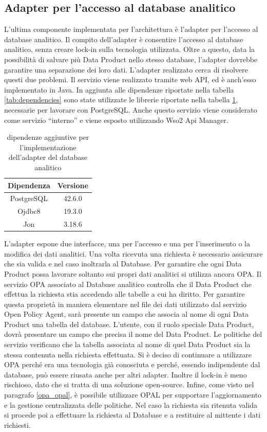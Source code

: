 \documentclass[12pt]{report}
\begin{document}
\subsection{Adapter per l'accesso al database analitico}
L'ultima componente implementata per l'architettura è l'adapter per l'accesso al database analitico.
Il compito dell'adapter è consentire l'accesso al database analitico, senza creare lock-in sulla tecnologia utilizzata.
Oltre a questo, data la possibilità di salvare più Data Product nello stesso database, l'adapter dovrebbe garantire una separazione dei loro dati.
L'adapter realizzato cerca di risolvere questi due problemi.
Il servizio viene realizzato tramite web API, ed è anch'esso implementato in Java.
In aggiunta alle dipendenze riportate nella tabella \ref{tab:dependencies} sono state utilizzate le librerie riportate nella tabella \ref{tab:dependencies2}, necessarie per lavorare con PostgreSQL.
Anche questo servizio viene considerato come servizio ``interno'' e viene esposto utilizzando Wso2 Api Manager.
\begin{table}
    \centering
    \begin{tabular}{|c|c|}
        \hline
        Dipendenza & Versione \\
        \hline
        PostgreSQL & 42.6.0 \\
        Ojdbc8 & 19.3.0 \\
        Jon & 3.18.6 \\
        \hline
    \end{tabular}
        \caption{dipendenze aggiuntive per l'implementazione dell'adapter del database analitico}
        \label{tab:dependencies2}
\end{table}
L'adapter espone due interfacce, una per l'accesso e una per l'inserimento o la modifica dei dati analitici.
Una volta ricevuta una richiesta è necessario assicurare che sia valida e nel caso inoltrarla al Database.
Per garantire che ogni Data Product possa lavorare soltanto sui propri dati analitici si utilizza ancora OPA.
Il servizio OPA associato al Database analitico controlla che il Data Product che effettua la richiesta stia accedendo alle tabelle a cui ha diritto.
Per garantire questa proprietà in maniera elementare nel file dei dati utilizzato dal servizio Open Policy Agent, sarà presente un campo che associa al nome di ogni Data Product una tabella del database.
L'utente, con il ruolo speciale Data Product, dovrà presentare un campo che precisa il nome del Data Product.
Le politiche del servizio verificano che la tabella associata al nome di quel Data Product sia la stessa contenuta nella richiesta effettuata.
Si è deciso di continuare a utilizzare OPA perché era una tecnologia già conosciuta e perché, essendo indipendente dal database, può essere riusata anche per altri adapter.
Inoltre il lock-in è meno rischioso, dato che si tratta di una soluzione open-source. 
Infine, come visto nel paragrafo \ref{opa_opal}, è possibile utilizzare OPAL per supportare l'aggiornamento e la gestione centralizzata delle politiche.
Nel caso la richiesta sia ritenuta valida si procede poi a effettuare la richiesta al Database e a restituire al mittente i dati richiesti.
\end{document}
